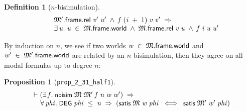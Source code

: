 \documentclass[letterpaper]{article}
\newtheorem{defn}{Definition}
\newtheorem{prop}{Proposition}
\renewcommand{\HOLConst}[1]{{\textsf{\upshape\small #1}}}
\renewcommand{\HOLinline}[1]{\ensuremath{#1}}
\newenvironment{holmath}{\begin{displaymath}\begin{array}{l}}{\end{array}\end{displaymath}\ignorespacesafterend}
\begin{document}
\begin{defn}[$n$-bisimulation]
\begin{holmath}
\;\;\;\;\;\;\HOLFreeVar{\ensuremath{\mathfrak{M}'}}.\HOLFieldName{frame}.\HOLFieldName{rel}\;\HOLBoundVar{v\sp{\prime}}\;\HOLBoundVar{u\sp{\prime}}\;\HOLSymConst{\HOLTokenConj{}}\;\HOLFreeVar{f}\;(\HOLBoundVar{i}\;\HOLSymConst{\ensuremath{+}}\;\HOLNumLit{1})\;\HOLBoundVar{v}\;\HOLBoundVar{v\sp{\prime}}\;\HOLSymConst{\HOLTokenImp{}}\\
\;\;\;\;\;\;\HOLSymConst{\HOLTokenExists{}}\HOLBoundVar{u}.\;\HOLBoundVar{u}\;\HOLSymConst{\HOLTokenIn{}}\;\HOLFreeVar{\ensuremath{\mathfrak{M}}}.\HOLFieldName{frame}.\HOLFieldName{world}\;\HOLSymConst{\HOLTokenConj{}}\;\HOLFreeVar{\ensuremath{\mathfrak{M}}}.\HOLFieldName{frame}.\HOLFieldName{rel}\;\HOLBoundVar{v}\;\HOLBoundVar{u}\;\HOLSymConst{\HOLTokenConj{}}\;\HOLFreeVar{f}\;\HOLBoundVar{i}\;\HOLBoundVar{u}\;\HOLBoundVar{u\sp{\prime}}
\end{holmath} 
\end{defn}

By induction on $n$, we see if two worlds \HOLinline{\HOLFreeVar{w}\;\HOLSymConst{\HOLTokenIn{}}\;\HOLFreeVar{\ensuremath{\mathfrak{M}}}.\HOLFieldName{frame}.\HOLFieldName{world}} and \HOLinline{\HOLFreeVar{w\sp{\prime}}\;\HOLSymConst{\HOLTokenIn{}}\;\HOLFreeVar{\ensuremath{\mathfrak{M}'}}.\HOLFieldName{frame}.\HOLFieldName{world}} are related by an $n$-bisimulation, then they agree on all modal formulas up to degree $n$:
\begin{prop}[\texttt{prop_2_31_half1}]
\begin{holmath}
  \ensuremath{\HOLTokenTurnstile}(\HOLSymConst{\HOLTokenExists{}}\HOLBoundVar{f}.\;\HOLConst{nbisim}\;\HOLFreeVar{\ensuremath{\mathfrak{M}}}\;\HOLFreeVar{\ensuremath{\mathfrak{M}'}}\;\HOLBoundVar{f}\;\HOLFreeVar{n}\;\HOLFreeVar{w}\;\HOLFreeVar{w\sp{\prime}})\;\HOLSymConst{\HOLTokenImp{}}\\
\;\;\;\;\;\HOLSymConst{\HOLTokenForall{}}\HOLBoundVar{phi}.\;\HOLConst{DEG}\;\HOLBoundVar{phi}\;\HOLSymConst{\HOLTokenLeq{}}\;\HOLFreeVar{n}\;\HOLSymConst{\HOLTokenImp{}}\;(\HOLConst{satis}\;\HOLFreeVar{\ensuremath{\mathfrak{M}}}\;\HOLFreeVar{w}\;\HOLBoundVar{phi}\;\HOLSymConst{\HOLTokenEquiv{}}\;\HOLConst{satis}\;\HOLFreeVar{\ensuremath{\mathfrak{M}'}}\;\HOLFreeVar{w\sp{\prime}}\;\HOLBoundVar{phi})
\end{holmath}
\end{prop}
\end{document}
